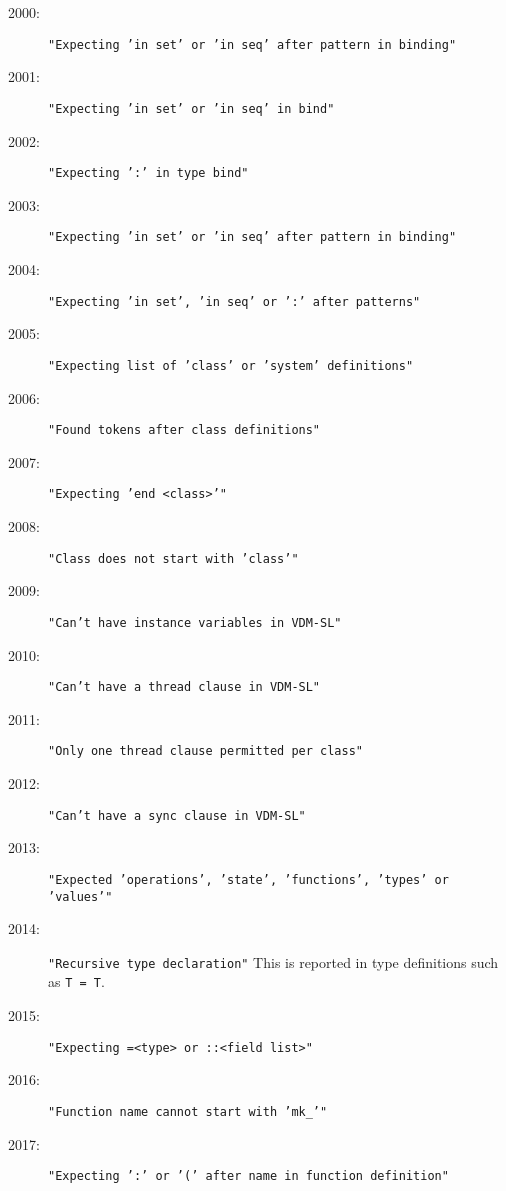 %
%
%

\begin{description}
\item[2000:] \texttt{"Expecting 'in set' or 'in seq' after pattern in binding"}
\item[2001:] \texttt{"Expecting 'in set' or 'in seq' in bind"}
\item[2002:] \texttt{"Expecting ':' in type bind"}
\item[2003:] \texttt{"Expecting 'in set' or 'in seq' after pattern in binding"}
\item[2004:] \texttt{"Expecting 'in set', 'in seq' or ':' after patterns"}
\item[2005:] \texttt{"Expecting list of 'class' or 'system' definitions"}
\item[2006:] \texttt{"Found tokens after class definitions"}
\item[2007:] \texttt{"Expecting 'end <class>'"}
\item[2008:] \texttt{"Class does not start with 'class'"}
\item[2009:] \texttt{"Can't have instance variables in VDM-SL"}
\item[2010:] \texttt{"Can't have a thread clause in VDM-SL"}
\item[2011:] \texttt{"Only one thread clause permitted per class"}
\item[2012:] \texttt{"Can't have a sync clause in VDM-SL"}
\item[2013:] \texttt{"Expected 'operations', 'state', 'functions', 'types' or 'values'"}
\item[2014:] \texttt{"Recursive type declaration"}  This is reported in
  type definitions such as \texttt{T = T}.
\item[2015:] \texttt{"Expecting =<type> or ::<field list>"}
\item[2016:] \texttt{"Function name cannot start with 'mk\_'"}
\item[2017:] \texttt{"Expecting ':' or '(' after name in function definition"}

\end{description}
